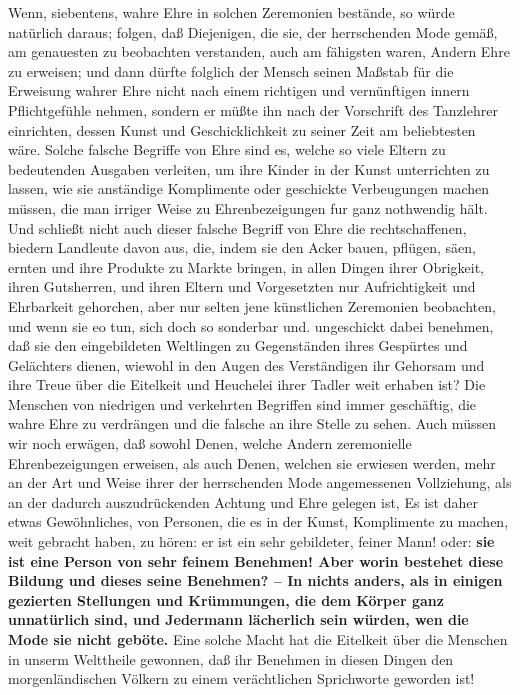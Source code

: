 Wenn, siebentens, wahre Ehre in solchen Zeremonien bestände, so würde natürlich
daraus; folgen, daß Diejenigen, die sie, der herrschenden Mode gemäß, am
genauesten zu beobachten verstanden, auch am fähigsten waren, Andern Ehre zu
erweisen; und dann dürfte folglich der Mensch seinen Maßstab für die Erweisung
wahrer Ehre nicht nach einem richtigen und vernünftigen innern Pflichtgefühle
nehmen, sondern er müßte ihn nach der Vorschrift des Tanzlehrer einrichten,
dessen Kunst und Geschicklichkeit zu seiner Zeit am beliebtesten wäre. Solche
falsche Begriffe von Ehre sind es, welche so viele Eltern
zu bedeutenden
Ausgaben verleiten, um ihre Kinder in der Kunst unterrichten zu lassen, wie sie
anständige Komplimente oder geschickte Verbeugungen machen müssen, die man
irriger Weise zu Ehrenbezeigungen fur ganz nothwendig hält.
 Und schließt nicht
auch dieser falsche Begriff von Ehre die rechtschaffenen, biedern Landleute
davon aus, die, indem sie den Acker bauen, pflügen, säen, ernten und ihre
Produkte zu Markte bringen, in allen Dingen ihrer Obrigkeit, ihren Gutsherren,
und ihren Eltern und Vorgesetzten nur Aufrichtigkeit und Ehrbarkeit gehorchen,
aber nur selten jene künstlichen Zeremonien beobachten, und wenn sie eo tun,
sich doch so sonderbar und. ungeschickt dabei benehmen, daß sie den
eingebildeten Weltlingen zu Gegenständen ihres Gespürtes und Gelächters dienen,
wiewohl in den Augen des Verständigen ihr Gehorsam und ihre Treue über die
Eitelkeit und Heuchelei ihrer Tadler weit erhaben ist? Die Menschen von
niedrigen und verkehrten Begriffen sind immer geschäftig, die wahre Ehre zu
verdrängen und die falsche an ihre Stelle zu sehen. Auch müssen wir noch
erwägen, daß sowohl Denen, welche Andern zeremonielle Ehrenbezeigungen erweisen,
als auch Denen, welchen sie erwiesen werden, mehr an der Art und Weise ihrer der
herrschenden Mode angemessenen Vollziehung, als an der dadurch auszudrückenden
Achtung und Ehre gelegen ist, Es ist daher etwas Gewöhnliches, von Personen, die
es in der Kunst, Komplimente zu machen, weit gebracht haben, zu hören: er ist
ein sehr gebildeter, feiner Mann! oder: \label{ref:09_26_feines_benemen} \textbf{sie ist
eine Person von sehr feinem
Benehmen! Aber worin bestehet diese Bildung und dieses seine Benehmen? -- In
nichts anders, als in einigen gezierten Stellungen und Krümmungen, die dem
Körper ganz unnatürlich sind, und Jedermann lächerlich sein würden, wen die Mode
sie nicht geböte.} Eine solche Macht hat die Eitelkeit über die Menschen in
unserm Welttheile gewonnen, daß ihr Benehmen in diesen Dingen den
morgenländischen Völkern zu einem verächtlichen Sprichworte geworden ist!

